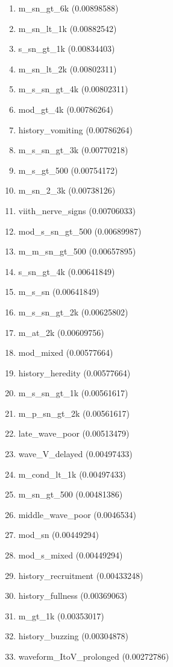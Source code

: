 \begin{enumerate}
\item m\_sn\_gt\_6k (0.00898588)
\item m\_sn\_lt\_1k (0.00882542)
\item s\_sn\_gt\_1k (0.00834403)
\item m\_sn\_lt\_2k (0.00802311)
\item m\_s\_sn\_gt\_4k (0.00802311)
\item mod\_gt\_4k (0.00786264)
\item history\_vomiting (0.00786264)
\item m\_s\_sn\_gt\_3k (0.00770218)
\item m\_s\_gt\_500 (0.00754172)
\item m\_sn\_2\_3k (0.00738126)
\item viith\_nerve\_signs (0.00706033)
\item mod\_s\_sn\_gt\_500 (0.00689987)
\item m\_m\_sn\_gt\_500 (0.00657895)
\item s\_sn\_gt\_4k (0.00641849)
\item m\_s\_sn (0.00641849)
\item m\_s\_sn\_gt\_2k (0.00625802)
\item m\_at\_2k (0.00609756)
\item mod\_mixed (0.00577664)
\item history\_heredity (0.00577664)
\item m\_s\_sn\_gt\_1k (0.00561617)
\item m\_p\_sn\_gt\_2k (0.00561617)
\item late\_wave\_poor (0.00513479)
\item wave\_V\_delayed (0.00497433)
\item m\_cond\_lt\_1k (0.00497433)
\item m\_sn\_gt\_500 (0.00481386)
\item middle\_wave\_poor (0.0046534)
\item mod\_sn (0.00449294)
\item mod\_s\_mixed (0.00449294)
\item history\_recruitment (0.00433248)
\item history\_fullness (0.00369063)
\item m\_gt\_1k (0.00353017)
\item history\_buzzing (0.00304878)
\item waveform\_ItoV\_prolonged (0.00272786)
\end{enumerate}
